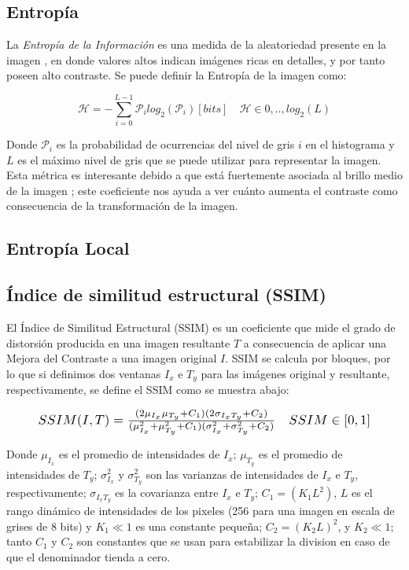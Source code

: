 \documentclass[spanish,twocolumn]{article}
\begin{document}
\subsection{Entropía}
\label{ssec:entropia}

La {\it Entropía de la Información} es una medida de la aleatoriedad presente en la imagen \cite{tsai2008information}, en donde valores altos indican imágenes ricas en detalles, y por tanto poseen alto contraste. Se puede definir la Entropía de la imagen como: 

\begin{equation}\label{eq:entropia}
\mathscr{H}=-\sum_{i=0}^{L-1}\mathcal{P}_i log_2(\mathcal{P}_i) [bits] \quad \mathscr{H} \in {0,..,log_2(L)} 
\end{equation}

Donde $\mathcal{P}_i$ es la probabilidad de ocurrencias del nivel de gris $i$ en el histograma y $L$ es el máximo nivel de gris que se puede utilizar para representar la imagen. Esta métrica es interesante debido a que está fuertemente asociada al brillo medio de la imagen \cite{108593}; este coeficiente nos ayuda a ver cuánto aumenta el contraste como consecuencia de la transformación de la imagen.


\subsection{Entropía Local}
\label{ssec:entropialocal}


\subsection{Índice de similitud estructural (SSIM)}
\label{ssec:ssim}
El {Índice de Similitud Estructural (SSIM)} \cite{wang2004image} es un coeficiente que mide el grado de distorsión producida en una imagen resultante $T$ a consecuencia de aplicar una Mejora del Contraste a una imagen original $I$. SSIM se calcula por bloques, por lo que si definimos dos ventanas $I_x$ e $T_y$ para las imágenes original y resultante, respectivamente, se define el SSIM como se muestra abajo:

\begin{equation}\label{eq:ssim}
\resizebox{.9\hsize}{!}
{
$SSIM(I,T)=\frac{(2\mu_{I_x}\mu_{T_y}+C_1)(2\sigma_{I_xT_y}+C_2)}{(\mu_{I_x}^2+\mu_{T_y}^2+C_1)(\sigma_{I_x}^2+\sigma_{T_y}^2+C_2)} \quad SSIM \in [0,1]$
}
\end{equation}

Donde $\mu_{I_x}$ es el promedio de intensidades de $I_x$; $\mu_{T_y}$ es el promedio de intensidades de $T_y$; $\sigma_{I_x}^2$ y $\sigma_{T_y}^2$ son las varianzas de intensidades de $I_x$ e $T_y$, respectivamente; $\sigma_{I_x T_y}$ es la covarianza entre $I_x$ e $T_y$; $C_1=(K_1L^2)$, $L$ es el rango dinámico de intensidades de los pixeles (256 para una imagen en escala de grises de 8 bits) y $K_1 \ll 1$ es una constante pequeña; $C_2=(K_2 L)^2$, y $K_2 \ll 1$; tanto $C_1$ y $C_2$ son constantes que se usan para estabilizar la division en caso de que el denominador tienda a cero.
\end{document}
